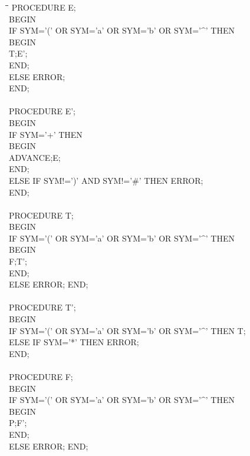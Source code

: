 \documentclass{article}
\begin{document}
\begin{tabbing}
    \hspace{0.5cm} \= \hspace{0.5cm}\= \hspace{0.5cm}\= \kill
    PROCEDURE E;\\
    BEGIN\\
    \>IF SYM='(' OR SYM='a' OR SYM='b' OR SYM='$\^{}$' THEN \\
    \>BEGIN\\
    \>\>T;E';\\
    \>END;\\
    \>ELSE ERROR;\\
    END;\\\\

    PROCEDURE E';\\
    BEGIN\\
    \>IF SYM='+' THEN\\
    \>BEGIN\\
    \>\>ADVANCE;E;\\
    \>END;\\
    \>ELSE IF SYM!=')' AND SYM!='\#' THEN ERROR;\\
    END;\\\\

    PROCEDURE T;\\
    BEGIN\\
    \>IF SYM='(' OR SYM='a' OR SYM='b' OR SYM='$\^{}$' THEN\\
    \>BEGIN\\
    \>\>F;T';\\
    \>END;\\ 
    \>ELSE ERROR;
    END;\\\\

    PROCEDURE T';\\
    BEGIN\\
    \>IF SYM='(' OR SYM='a' OR SYM='b' OR SYM='$\^{}$' THEN T;\\
    ELSE IF SYM='*' THEN ERROR;\\
    END;\\\\

    PROCEDURE F;\\
    BEGIN\\
    \>IF SYM='(' OR SYM='a' OR SYM='b' OR SYM='$\^{}$' THEN\\
    \>BEGIN\\
    \>\>P;F';\\
    \>END;\\ 
    \>ELSE ERROR;
    END;\\\\


\end{tabbing}
\end{document}
